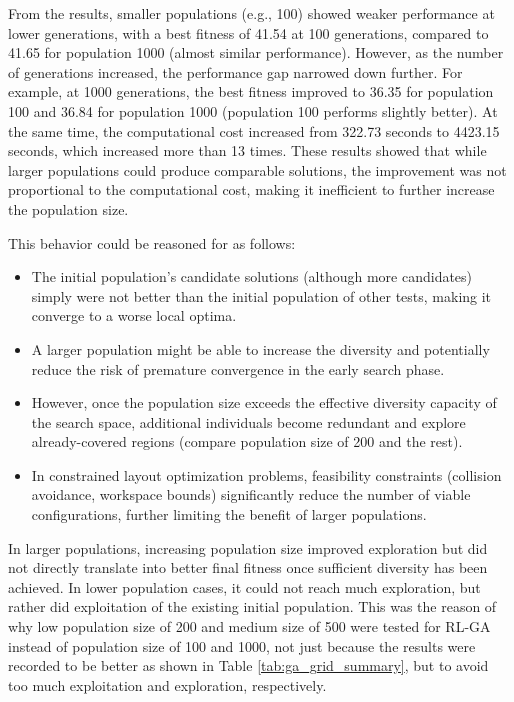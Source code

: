 \documentclass{article}
\begin{document}
From the results, smaller populations (e.g., 100) showed weaker performance at lower generations, with a best fitness
of 41.54 at 100 generations, compared to 41.65 for population 1000 (almost similar performance). However, as the number of generations
increased, the performance gap narrowed down further. For example, at 1000 generations, the best fitness improved to 36.35
for population 100 and 36.84 for population 1000 (population 100 performs slightly better). At the same time, the computational cost increased from 322.73 seconds to 4423.15 seconds, which increased more than 13 times. These results showed that while larger populations could produce comparable solutions,
the improvement was not proportional to the computational cost, making it inefficient to further increase the population size.

This behavior could be reasoned for as follows:
\begin{itemize}
    \item The initial population's candidate solutions (although more candidates) simply were not better than the initial population of other tests, making it converge to a worse local optima.
    \item A larger population might be able to increase the diversity and potentially reduce the risk of premature convergence in the early search phase.
    \item However, once the population size exceeds the effective diversity capacity of the search space, additional individuals become redundant and explore already-covered regions (compare population size of 200 and the rest). 
    \item In constrained layout optimization problems, feasibility constraints (collision avoidance, workspace bounds) significantly reduce the number of viable configurations, further limiting the benefit of larger populations.
\end{itemize}

In larger populations, increasing population size improved exploration but did not directly translate into better final fitness once sufficient diversity has been achieved. In lower population cases, it could not reach much exploration, but rather did exploitation of the existing initial population. This was the reason of why low population size of 200 and medium size of 500 were tested for RL-GA instead of population size of 100 and 1000, not just because the results were recorded to be better as shown in Table \ref{tab:ga_grid_summary}, but to avoid too much exploitation and exploration, respectively.
\end{document}
